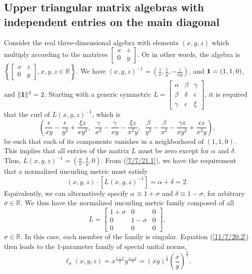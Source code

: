 \documentclass{amsart}
\numberwithin{equation}{section}
\theoremstyle{definition}
\numberwithin{theorem}{section}
\begin{document}
 \subsection{Upper triangular matrix algebras with independent entries on the main diagonal} Consider the real three-dimensional algebra with elements $(x,y,z)$ which multiply according to the matrices 
$\left[
\begin{array}{ccc}
 x & z   \\
 0 & y    
\end{array}
\right]$.  Or in other words, the algebra is $\left\{ \left[
\begin{array}{ccc}
 x & z   \\
 0 & y    
\end{array}
\right],x,y,z\in\mathbb{R}\right\}$.  We have $(x,y,z)^{-1} = \left( \frac{1}{x}, \frac{1}{y}, -\frac{z}{xy} \right)$, and ${\bf 1}= (1,1,0)$, and $\|{\bf 1}\|^2 = 2$.  Starting with a generic symmetric $L = \left[
\begin{array}{ccc}
 \alpha & \beta & \gamma   \\
 \beta & \delta & \epsilon \\ \gamma & \epsilon & \xi    
\end{array}
\right]$, 
it is required that the curl of $L(x,y,z)^{-1}$, which is \[\left( \frac{\epsilon}{xy} - \frac{\epsilon}{y^2} + \frac{\xi z}{xy^2},\,\,\, \frac{\gamma}{x^2} - \frac{\gamma}{xy} - \frac{\xi z}{x^2y}, \,\,\, \frac{\beta}{y^2} - \frac{\beta}{x^2} - \frac{\gamma z}{xy^2} + \frac{\epsilon z}{x^2y} \right),\] be such that each of its components vanishes in a neighborhood of $(1,1,0)$.  This implies that all entries of the matrix $L$ must be zero except for $\alpha$ and $\delta$.   Thus, $L(x,y,z)^{-1} = (\frac{\alpha}{x}, \frac{\delta}{y},0)$.  From (\ref{7/7/21.1}), we have the requirement that a normalized uncurling metric must satisfy \[ (x,y,z)\cdot [L(x,y,z)^{-1}] = \alpha +\delta =  2.\]  Equivalently, we can alternatively specify $\alpha \equiv 1+\sigma$ and $\delta \equiv 1-\sigma$, for arbitrary $\sigma\in\mathbb{R}$.   We thus have the normalized uncurling metric family composed of all  \enlargethispage{1cm}\begin{equation}\label{11/17/22.2} L = \left[
\begin{array}{ccc}
 1+\sigma & 0 & 0   \\
 0 & 1-\sigma & 0 \\ 0 & 0 & 0    
\end{array}
\right],\end{equation} $\sigma\in\mathbb{R}$.  In this case, each member of the family is singular.  Equation (\ref{11/7/20.2}) then leads to the 1-parameter family of special unital norms, \begin{equation}\label{12/21/21.1} \ell_\sigma(x,y,z) = x^\frac{1+\sigma}{2} y^\frac{1-\sigma}{2} = (xy)^{\frac{1}{2}}\left(\frac{x}{y}\right)^{\frac{\sigma}{2}}.\end{equation} 
\end{document}
